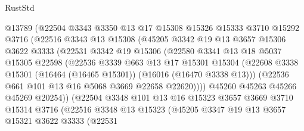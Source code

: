 \begin{lexlean}{RustStd}
\begin{coremodule}
                    @13789
                    (@22504
                      @3343
                      @3350
                      @13
                      @17
                      @15308
                      @15326
                      @15333
                      @3710
                      @15292
                      @3716
                      (@22516
                        @3343
                        @13
                        @15308
                        (@45205
                          @3342
                          @19
                          @13
                          @3657
                          @15306
                          @3622
                          @3333
                          (@22531
                            @3342
                            @19
                            @15306
                            (@22580
                              @3341
                              @13
                              @18
                              @5037
                              @15305
                              @22598
                              (@22536
                                @3339
                                @663
                                @13
                                @17
                                @15301
                                @15304
                                (@22608
                                  @3338
                                  @15301
                                  (@16464 (@16465 @15301))
                                  (@16016 (@16470 @3338 @13)))
                                (@22536 @661 @101 @13 @16 @5068 @3669 @22658 @22620))))
                          @45260
                          @45263
                          @45266
                          @45269
                          @20254))
                      (@22504
                        @3348
                        @101
                        @13
                        @16
                        @15323
                        @3657
                        @3669
                        @3710
                        @15314
                        @3716
                        (@22516
                          @3348
                          @13
                          @15323
                          (@45205
                            @3347
                            @19
                            @13
                            @3657
                            @15321
                            @3622
                            @3333
                            (@22531

\end{coremodule}
\end{lexlean}
